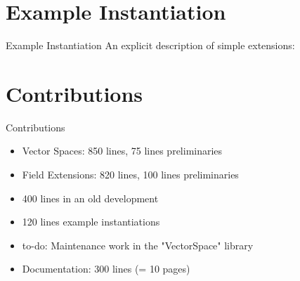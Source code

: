 \documentclass[%
	sans,
	12pt,
]{beamer}
\newcommand{\RR}{\mathbb{R}}
\begin{document}
\section{Example Instantiation}

\begin{frame}{Example Instantiation}%
An explicit description of simple extensions: %
\end{frame}


\section{Contributions}
\begin{frame}{Contributions}
\begin{itemize}
	\item Vector Spaces: 850 lines, 75 lines preliminaries\pause
	\item Field Extensions: 820 lines, 100 lines preliminaries\pause%
	\item 400 lines in an old development %
	\item 120 lines example instantiations %
	\item to-do: Maintenance work in the "VectorSpace" library
	\item Documentation: 300 lines (= 10 pages)
\end{itemize}
\end{frame}
\end{document}

